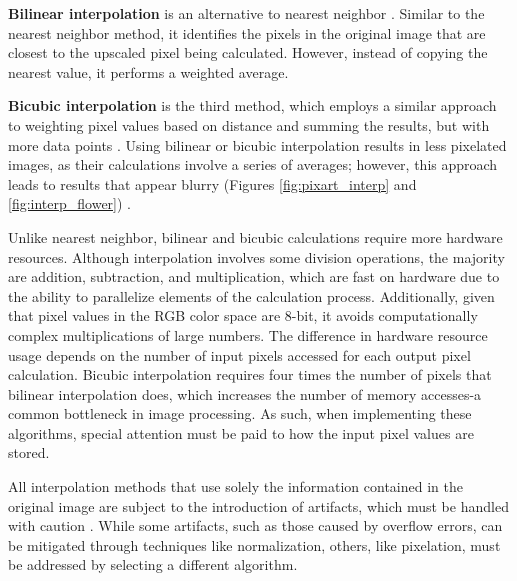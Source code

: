 \documentclass{article}
\begin{document}
    \par \textbf{Bilinear interpolation} is an alternative to nearest neighbor \cite{patel_review_2013}. Similar to the nearest neighbor method, it identifies the pixels in the original image that are closest to the upscaled pixel being calculated. However, instead of copying the nearest value, it performs a weighted average. 

    \par \textbf{Bicubic interpolation} is the third method, which employs a similar approach to weighting pixel values based on distance and summing the results, but with more data points \cite{amanrao_image_2023}. Using bilinear or bicubic interpolation results in less pixelated images, as their calculations involve a series of averages; however, this approach leads to results that appear blurry (Figures \ref{fig:pixart_interp} and \ref{fig:interp_flower}) \cite{patel_review_2013}.

    \par Unlike nearest neighbor, bilinear and bicubic calculations require more hardware resources. Although interpolation involves some division operations, the majority are addition, subtraction, and multiplication, which are fast on hardware due to the ability to parallelize elements of the calculation process. Additionally, given that pixel values in the RGB color space are 8-bit, it avoids computationally complex multiplications of large numbers. The difference in hardware resource usage depends on the number of input pixels accessed for each output pixel calculation. Bicubic interpolation requires four times the number of pixels that bilinear interpolation does, which increases the number of memory accesses-a common bottleneck in image processing. As such, when implementing these algorithms, special attention must be paid to how the input pixel values are stored. 

    \par All interpolation methods that use solely the information contained in the original image are subject to the introduction of artifacts, which must be handled with caution \cite{giachetti_real_time_2011}. While some artifacts, such as those caused by overflow errors, can be mitigated through techniques like normalization, others, like pixelation, must be addressed by selecting a different algorithm. 
    
\end{document}
